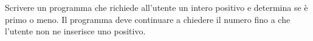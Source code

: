 \begin{Exercise}[label={ex:primo}]
  Scrivere un programma che richiede all'utente un intero positivo e determina se è primo o meno. Il programma deve continuare a chiedere il numero fino a che l'utente non ne inserisce uno positivo.
\end{Exercise}

\begin{Answer}[ref={ex:primo}]
  

  
\end{Answer}